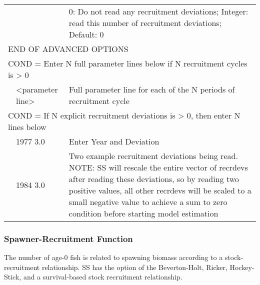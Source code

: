 \begin{center}
\begin{longtable}{p{1cm} p{3cm} p{11cm}}
		&      & 0: Do not read any recruitment deviations; Integer: read this number of recruitment deviations; Default:  0 \\
		\multicolumn{3}{l}{END OF ADVANCED OPTIONS}\\
		\hline
		\multicolumn{3}{l}{COND = Enter N full parameter lines below if N recruitment cycles is > 0}\\
		& <parameter line> & Full parameter line for each of the N periods of recruitment cycle\\
		\hline
		\multicolumn{3}{l}{COND = If N explicit recruitment deviations is > 0, then enter N lines below}\\
		& 1977 3.0 & Enter Year and Deviation\\
		& 1984 3.0 & Two example recruitment deviations being read.  NOTE:  SS will rescale the entire vector of recrdevs after reading these deviations, so by reading two positive values, all other recrdevs will be scaled to a small negative value to achieve a sum to zero condition before starting model estimation\\
		\hline
	\end{longtable}
\end{center}

\subsubsection{Spawner-Recruitment Function}
The number of age-0 fish is related to spawning biomass according to a stock-recruitment relationship.  SS has the option of the Beverton-Holt, Ricker, Hockey-Stick, and a survival-based stock recruitment relationship.

